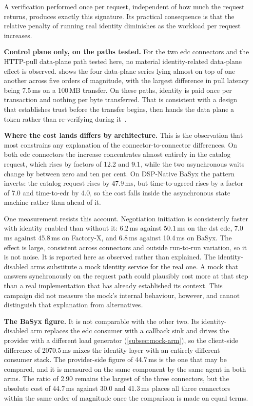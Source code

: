 A verification performed once per request, independent of how much the request returns, produces exactly
this signature. Its practical consequence is that the relative penalty of running real
identity diminishes as the workload per request increases.

\textbf{Control plane only, on the paths tested.} For the two \gls{edc} connectors and the HTTP-pull data-plane path tested here, no material identity-related data-plane effect is observed.  shows the four
data-plane series lying almost on top of one another across five orders of magnitude, with
the largest difference in pull latency being 7.5\,ms on a 100\,MB transfer. On these paths, identity is paid once per transaction and nothing per byte transferred. That is consistent with a design that establishes trust before the transfer begins, then hands the data plane a token rather than re-verifying during it~\citep{dcpSpec}.

\pagebreak

\textbf{Where the cost lands differs by architecture.} This is the observation that most constrains any explanation of the connector-to-connector differences. On both
\gls{edc} connectors the increase concentrates almost entirely in the catalog request,
which rises by factors of 12.2 and 9.1, while the two asynchronous waits change by between
zero and ten per cent. On DSP-Native BaSyx the pattern inverts: the catalog request rises
by 47.9\,ms, but time-to-agreed rises by a factor of 7.0 and time-to-\gls{edr} by 4.0, so
the cost falls inside the asynchronous state machine rather than ahead of it.

One measurement resists this account. Negotiation initiation is consistently faster
with identity enabled than without it: 6.2\,ms against 50.1\,ms on the \gls{dst}
\gls{edc}, 7.0\,ms against 45.8\,ms on Factory-X, and 6.8\,ms against 10.4\,ms on BaSyx.
The effect is large, consistent across connectors and outside run-to-run variation, so it
is not noise. It is reported here as observed rather than explained. The identity-disabled arms substitute a mock identity service for the real one. A mock that answers synchronously on the request path could plausibly cost more at that step than a real implementation that has already established its context. This campaign did not measure
the mock's internal behaviour, however, and cannot distinguish that explanation from
alternatives.

\textbf{The BaSyx figure.} It is not comparable with the other two. Its identity-disabled arm
replaces the \gls{edc} consumer with a callback sink and drives the provider with a
different load generator (\cref{subsec:mock-arm}), so the client-side difference of
2070.5\,ms mixes the identity layer with an entirely different consumer stack. The
provider-side figure of 44.7\,ms is the one that may be compared, and it is measured on
the same component by the same agent in both arms. The ratio of 2.90 remains the largest
of the three connectors, but the absolute cost of 44.7\,ms against 30.0 and 41.3\,ms places all three connectors within the same order of magnitude once the comparison is made
on equal terms.

